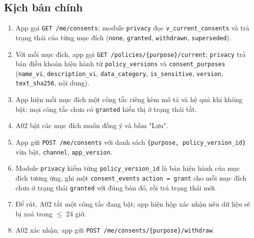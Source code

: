 \subsection{Kịch bản chính}
\begin{enumerate}
\item App gọi {\small\texttt{GET /\allowbreak{}\allowbreak{}me/\allowbreak{}\allowbreak{}consents}}; module {\small\texttt{privacy}} đọc {\small\texttt{v\_\allowbreak{}\allowbreak{}current\_\allowbreak{}\allowbreak{}consents}} và trả trạng thái của từng mục đích ({\small\texttt{none}}, {\small\texttt{granted}}, {\small\texttt{withdrawn}}, {\small\texttt{superseded}}).
\item Với mỗi mục đích, app gọi {\small\texttt{GET /\allowbreak{}\allowbreak{}policies/\allowbreak{}\allowbreak{}\{purpose\}/\allowbreak{}\allowbreak{}current}}; {\small\texttt{privacy}} trả bản điều khoản hiện hành từ {\small\texttt{policy\_\allowbreak{}\allowbreak{}versions}} và {\small\texttt{consent\_\allowbreak{}\allowbreak{}purposes}} ({\small\texttt{name\_\allowbreak{}\allowbreak{}vi}}, {\small\texttt{description\_\allowbreak{}\allowbreak{}vi}}, {\small\texttt{data\_\allowbreak{}\allowbreak{}category}}, {\small\texttt{is\_\allowbreak{}\allowbreak{}sensitive}}, {\small\texttt{version}}, {\small\texttt{text\_\allowbreak{}\allowbreak{}sha256}}, nội dung).
\item App hiện mỗi mục đích một công tắc riêng kèm mô tả và hệ quả khi không bật; mọi công tắc chưa có {\small\texttt{granted}} hiển thị ở trạng thái tắt.
\item A02 bật các mục đích muốn đồng ý và bấm "Lưu".
\item App gửi {\small\texttt{POST /\allowbreak{}\allowbreak{}me/\allowbreak{}\allowbreak{}consents}} với danh sách {\small\texttt{\{purpose, policy\_\allowbreak{}\allowbreak{}version\_\allowbreak{}\allowbreak{}id\}}} vừa bật, {\small\texttt{channel}}, {\small\texttt{app\_\allowbreak{}\allowbreak{}version}}.
\item Module {\small\texttt{privacy}} kiểm từng {\small\texttt{policy\_\allowbreak{}\allowbreak{}version\_\allowbreak{}\allowbreak{}id}} là bản hiện hành của mục đích tương ứng, ghi một {\small\texttt{consent\_\allowbreak{}\allowbreak{}events}} {\small\texttt{action = grant}} cho mỗi mục đích chưa ở trạng thái {\small\texttt{granted}} với đúng bản đó, rồi trả trạng thái mới.
\item Để rút, A02 tắt một công tắc đang bật; app hiện hộp xác nhận nêu dữ liệu sẽ bị xoá trong \ensuremath{\leq} 24 giờ.
\item A02 xác nhận; app gửi {\small\texttt{POST /\allowbreak{}\allowbreak{}me/\allowbreak{}\allowbreak{}consents/\allowbreak{}\allowbreak{}\{purpose\}/\allowbreak{}\allowbreak{}withdraw}}.

\end{enumerate}
